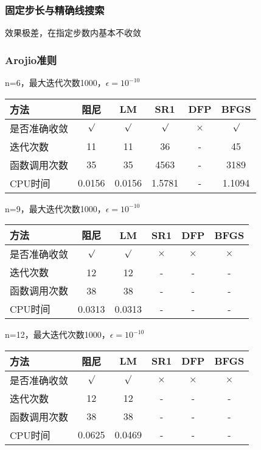 \documentclass[11pt, a4paper]{article}
\begin{document}
\subsubsection{固定步长与精确线搜索}

效果极差，在指定步数内基本不收敛

\subsubsection{Arojio准则}

n=6，最大迭代次数1000，$\epsilon=10^{-10}$

\vspace{10pt}
\begin{tabular}{|l|c|c|c|c|c|}
	\hline
	方法 & 阻尼 & LM & SR1 & DFP & BFGS \\\hline
	是否准确收敛 & $\surd$ & $\surd$ & $\surd$ & $\times$ & $\surd$ \\\hline
	迭代次数 & 11 & 11 & 36 & - & 45 \\\hline
	函数调用次数 & 35 & 35 & 4563 & - & 3189 \\\hline
	CPU时间 & 0.0156 & 0.0156 & 1.5781 & - & 1.1094\\\hline
\end{tabular}

\vspace{20pt}
n=9，最大迭代次数1000，$\epsilon=10^{-10}$

\vspace{10pt}
\begin{tabular}{|l|c|c|c|c|c|}
	\hline
	方法 & 阻尼 & LM & SR1 & DFP & BFGS \\\hline
	是否准确收敛 & $\surd$ & $\surd$ & $\times$ & $\times$ & $\times$ \\\hline
	迭代次数 & 12 & 12 & - & - & - \\\hline
	函数调用次数 & 38 & 38 & - & - & - \\\hline
	CPU时间 & 0.0313 & 0.0313 & - & - & -\\\hline
\end{tabular}

\vspace{20pt}
n=12，最大迭代次数1000，$\epsilon=10^{-10}$

\vspace{10pt}
\begin{tabular}{|l|c|c|c|c|c|}
	\hline
	方法 & 阻尼 & LM & SR1 & DFP & BFGS \\\hline
	是否准确收敛 & $\surd$ & $\surd$ & $\times$ & $\times$ & $\times$ \\\hline
	迭代次数 & 12 & 12 & - & - & - \\\hline
	函数调用次数 & 38 & 38 & - & - & - \\\hline
	CPU时间 & 0.0625 & 0.0469 & - & - & -\\\hline
\end{tabular}
\end{document}
